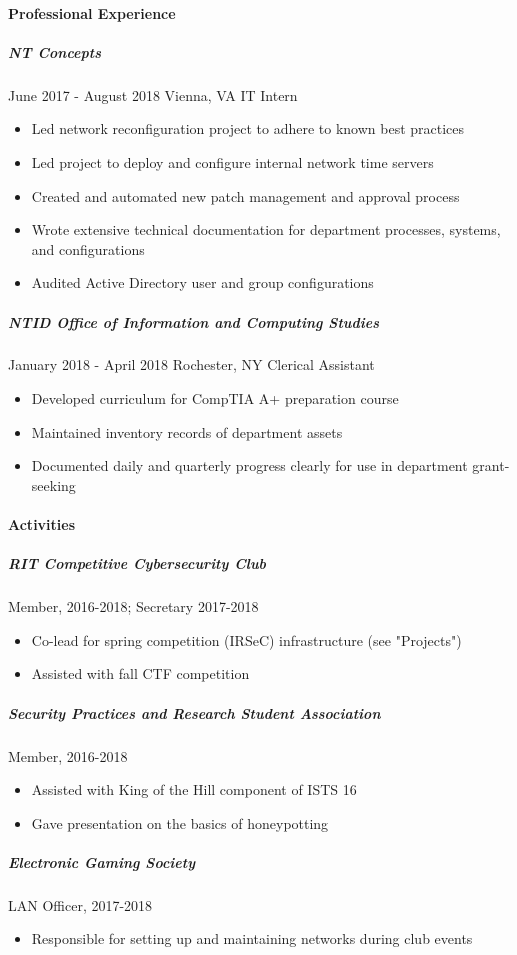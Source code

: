 \documentclass{article}
\begin{document}
\paragraph{Professional Experience}
\subparagraph{NT Concepts}
June 2017 - August 2018
Vienna, VA
IT Intern
\begin{itemize}
	\item Led network reconfiguration project to adhere to known best practices
	\item Led project to deploy and configure internal network time servers
	\item Created and automated new patch management and approval process
	\item Wrote extensive technical documentation for department processes, systems, and configurations
	\item Audited Active Directory user and group configurations
\end{itemize}
\subparagraph{NTID Office of Information and Computing Studies}
January 2018 - April 2018
Rochester, NY
Clerical Assistant
\begin{itemize}
	\item Developed curriculum for CompTIA A+ preparation course
	\item Maintained inventory records of department assets
	\item Documented daily and quarterly progress clearly for use in department grant-seeking
\end{itemize}

\paragraph{Activities}
\subparagraph{RIT Competitive Cybersecurity Club}Member, 2016-2018; Secretary 2017-2018
\begin{itemize}
	\item Co-lead for spring competition (IRSeC) infrastructure (see "Projects")
	\item Assisted with fall CTF competition
\end{itemize}
\subparagraph{Security Practices and Research Student Association}Member, 2016-2018
\begin{itemize}
	\item Assisted with King of the Hill component of ISTS 16
	\item Gave presentation on the basics of honeypotting
\end{itemize}
\subparagraph{Electronic Gaming Society}LAN Officer, 2017-2018
\begin{itemize}
	\item Responsible for setting up and maintaining networks during club events
\end{itemize}
\end{document}
